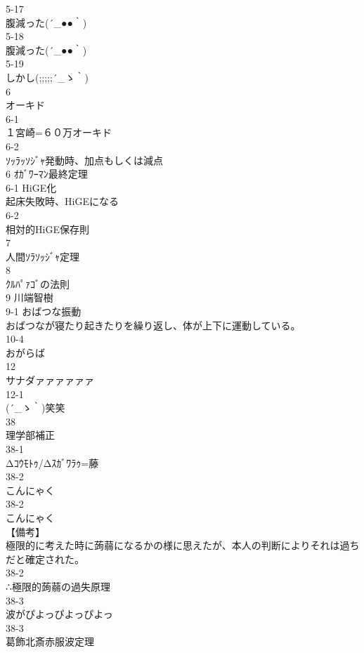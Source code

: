 5-17\\
腹減った\sf (´\_●●｀)\\
5-18\\
腹減った\sf (´\_●●｀)\\
5-19\\
しかし\sf (;;;;;´\_ゝ｀)\\
6\\
オーキド\\
6-1\\
１宮崎=６０万オーキド \\
6-2\\
ｿｯﾗｯｿｼﾞｬ発動時、加点もしくは減点\\
6 ｵｶﾞﾜｰﾏﾝ最終定理\\
6-1 HiGE化\\
起床失敗時、HiGEになる\\
6-2\\
相対的HiGE保存則\\
7\\
人間ｿﾗｿｯｼﾞｬ定理\\
8\\
ｸﾙﾊﾟｧｺﾞの法則\\
9 川端智樹\\
9-1 おばつな振動\\
おばつなが寝たり起きたりを繰り返し、体が上下に運動している。\\
10-4\\
おがらば\\
12\\
サナダァァァァァァ\\
12-1\\
\sf (´\_ゝ｀)笑笑\\
38\\
理学部補正\\
38-1\\
Δｺｳﾓﾄｩ/Δｽｶﾞﾜﾗｩ=藤\\
38-2\\
こんにゃく\\
38-2\\
こんにゃく\\
【備考】\\
極限的に考えた時に蒟蒻になるかの様に思えたが、本人の判断によりそれは過ちだと確定された。\\
38-2\\
∴極限的蒟蒻の過失原理\\
38-3\\
波がぴよっぴよっぴよっ\\
38-3\\
葛飾北斎赤服波定理\\
